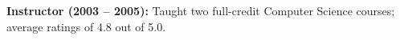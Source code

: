 \begin{cvonelinesubsection}{}{}{}	
        \textbullet\hspace{0.1cm} \textbf{Instructor (2003 – 2005):} Taught two full-credit Computer Science courses; average ratings of 4.8 out of 5.0.
\end{cvonelinesubsection}